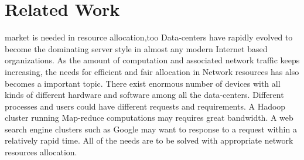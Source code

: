 \documentclass[a4paper,11pt,twocolumn]{article}
\begin{document}
\section{Related Work}
 market is needed in resource allocation,too
Data-centers have rapidly evolved to become the dominating server style in almost
any modern Internet based organizations. As the amount of computation and associated
network  traffic keeps increasing, the needs for efficient and fair  allocation in  Network resources
has also becomes a important topic. There exist enormous number of devices with all 
kinds of different hardware and software among all the data-centers. Different processes and users could
have different requests and requirements. A Hadoop cluster running Map-reduce computations 
may requires great bandwidth.
A web search engine clusters such as Google may want to response to a request 
within a relatively rapid time. All of the needs are to be solved with appropriate network resources
allocation.
\end{document}
